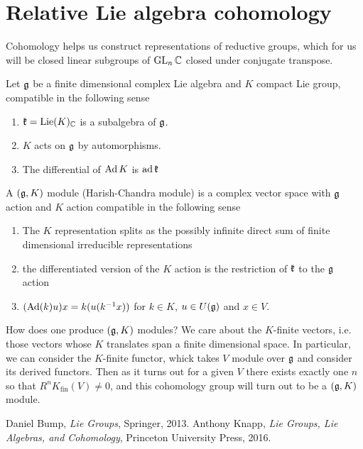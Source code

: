\documentclass[12pt]{article}
\begin{document}
\section{Relative Lie algebra cohomology}
Cohomology helps us construct representations of reductive groups, which for us will be 
closed linear subgroups of $\operatorname{GL}_n\mathbb{C}$ closed under conjugate transpose. 

\hfill

Let $\mathfrak{g}$ be a finite dimensional complex Lie algebra and $K$ compact Lie group, compatible in the following sense
\begin{enumerate}
    \item $\mathfrak{k} = \operatorname{Lie}(K)_{\mathbb{C}} $ is a subalgebra of $\mathfrak{g}$.
    \item $K$ acts on $\mathfrak{g}$ by automorphisms.
    \item The differential of $\operatorname{Ad} K$ is $\operatorname{ad} \mathfrak{k}$
\end{enumerate}

A $(\mathfrak{g},K)$ module (Harish-Chandra module) is a complex vector space with $\mathfrak{g}$ action and $K$ action compatible in the following sense 
\begin{enumerate}
    \item The $K$ representation splits as the possibly infinite direct sum of finite dimensional irreducible representations
    \item the differentiated version of the $K$ action is the restriction of $\mathfrak{k}$ to the $\mathfrak{g}$ action
    \item $(\operatorname{Ad}(k)u)x = k(u(k^{-1}x))$ for $k\in K$, $u\in U(\mathfrak{g})$ and $x\in V$.
\end{enumerate}

How does one produce $(\mathfrak{g},K)$ modules? 
We care about the $K$-finite vectors, i.e. those vectors whose $K$ translates span a finite dimensional space.
In particular, we can consider the $K$-finite functor, whick takes $V$ module over $\mathfrak{g}$ and consider its derived functors.
Then as it turns out for a given $V$ there exists exactly one $n$ so that $R^nK_\text{fin}(V) \neq 0$, and 
this cohomology group will turn out to be a $(\mathfrak{g},K)$ module.
\begin{thebibliography}{9}
    Daniel Bump, \textit{Lie Groups}, Springer, 2013.
    Anthony Knapp, \textit{Lie Groups, Lie Algebras, and Cohomology}, Princeton University Press, 2016.
\end{thebibliography}
\end{document}
